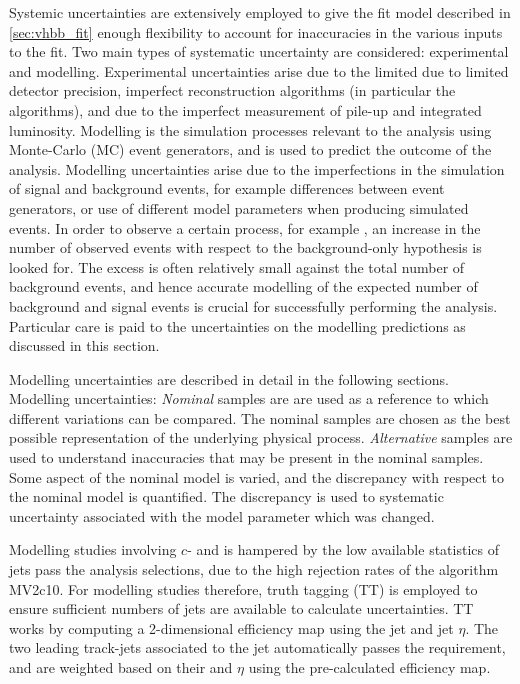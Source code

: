 Systemic uncertainties are extensively employed to give the fit model described in \cref{sec:vhbb_fit} enough flexibility to account for inaccuracies in the various inputs to the fit.
Two main types of systematic uncertainty are considered: experimental and modelling.
Experimental uncertainties arise due to the limited due to limited detector precision, imperfect reconstruction algorithms (in particular the \btagging algorithms), and due to the imperfect measurement of pile-up and integrated luminosity.
Modelling is the simulation processes relevant to the analysis using Monte-Carlo (MC) event generators, and is used to predict the outcome of the analysis.
Modelling uncertainties arise due to the imperfections in the simulation of signal and background events, for example differences between event generators, or use of different model parameters when producing simulated events.
In order to observe a certain process, for example \VHbb, an increase in the number of observed events with respect to the background-only hypothesis is looked for.
The excess is often relatively small against the total number of background events, and hence accurate modelling of the expected number of background and signal events is crucial for successfully performing the analysis.
Particular care is paid to the uncertainties on the modelling predictions as discussed in this section.

Modelling uncertainties are described in detail in the following sections.
Modelling uncertainties:
\textit{Nominal} samples are are used as a reference to which different variations can be compared.
The nominal samples are chosen as the best possible representation of the underlying physical process.
\textit{Alternative} samples are used to understand inaccuracies that may be present in the nominal samples.
Some aspect of the nominal model is varied, and the discrepancy with respect to the nominal model is quantified.
The discrepancy is used to systematic uncertainty associated with the model parameter which was changed.

Modelling studies involving $c$- and \ljets is hampered by the low available statistics of jets pass the analysis selections, due to the high rejection rates of the \btagging algorithm MV2c10.
For modelling studies therefore, truth tagging (TT) is employed to ensure sufficient numbers of jets are available to calculate uncertainties.
TT works by computing a 2-dimensional efficiency map using the jet \pt and jet $\eta$.
The two leading track-jets associated to the \largeR jet automatically passes the \btagging requirement, and are weighted based on their \pt and $\eta$ using the pre-calculated efficiency map.


